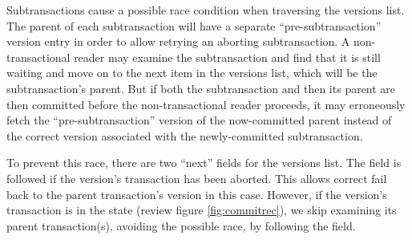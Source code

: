 \documentclass[11pt,notitlepage]{article}
\begin{document}
Subtransactions cause a possible race condition when traversing the
versions list.  The parent of each subtransaction will have a separate
``pre-subtransaction'' version entry in order to allow retrying an
aborting subtransaction.  A non-transactional reader may examine the
subtransaction and find that it is still waiting and move on to the
next item in the versions list, which will be the subtransaction's
parent.  But if both the subtransaction and then its parent are then
committed before the non-transactional reader proceeds, it may
erroneously fetch the ``pre-subtransaction'' version of the
now-committed parent instead of the correct version associated with
the newly-committed subtransaction.

To prevent this race, there are two ``next'' fields for the versions
list.  The  field is followed if the version's transaction
has been aborted.  This allows correct fail back to the parent
transaction's version in this case.  However, if the version's
transaction is in the  state (review figure
\ref{fig:commitrec}), we skip examining its parent transaction(s),
avoiding the possible race, by following the  field.
\end{document}
